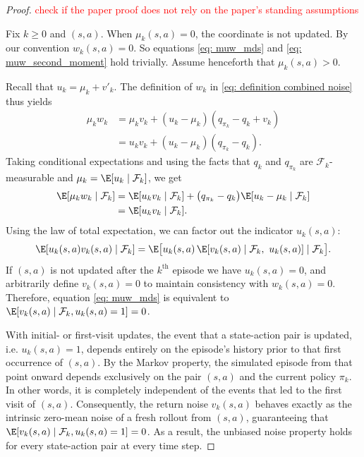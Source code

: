 \begin{proof}
\textcolor{red}{check if the paper proof does not rely on the paper's standing assumptions}

Fix $k\ge 0$ and $(s,a)$. When $\mu_k(s,a)=0$, the coordinate is not updated. By our convention $w_k(s,a)=0$. So equations \eqref{eq: muw_mds} and \eqref{eq: muw_second_moment} hold trivially. Assume henceforth that $\mu_k(s,a)>0$.

Recall that $u_k=\mu_k+v'_k$.
The definition of $w_k$ in \eqref{eq: definition combined noise} thus yields
\begin{align}
\label{eq: algebra_rewrite_muw}
\mu_k w_k
&= \mu_k v_k + (u_k-\mu_k)(q_{\pi_k}-q_k+v_k) \nonumber\\
&= u_k v_k + (u_k-\mu_k)(q_{\pi_k} - q_k).
\end{align}
Taking conditional expectations and using the facts that $q_k$ and $q_{\pi_k}$ are $\mathcal F_k$-measurable and $\mu_k=\E[u_k\mid \mathcal F_k]$, we get
\begin{align}
\label{eq: refactor noise}
\E[\mu_k w_k \mid \mathcal F_k] &= \E[u_k v_k \mid \mathcal F_k] + \big(q_{\pi_k}-q_k\big)\E[u_k-\mu_k\mid \mathcal F_k] 
\nonumber \\
&= \E[u_k v_k\mid \mathcal F_k] .
\end{align}
Using the law of total expectation, we can factor out the indicator $u_k(s,a)$:
\begin{align}
\label{eq: showter expectation}
\E[u_k(s,a)v_k(s,a)\mid \mathcal F_k] 
= \E\big[
u_k(s,a)\,\E[v_k(s,a)\mid \mathcal F_k,\ u_k(s,a)]\mid \mathcal F_k
\big] .
\end{align}
If $(s,a)$ is not updated after the $k^{\text{th}}$ episode we have $u_k(s,a)=0$, and arbitrarily define $v_k(s,a) = 0$ to maintain consistency with $w_k(s,a)=0$.
Therefore, 
equation \eqref{eq: muw_mds} is equivalent to $\E[v_k(s,a)\mid \mathcal F_k, u_k(s,a)=1] = 0$.

With initial- or first-visit updates, the event that a state-action pair is updated, i.e. $u_k(s,a) = 1$, depends entirely on the episode's history prior to that first occurrence of $(s,a)$. By the Markov property, the simulated episode from that point onward depends exclusively on the pair $(s,a)$ and the current policy $\pi_k$. In other words, it is completely independent of the events that led to the first visit of $(s,a)$. Consequently, the return noise $v_k(s,a)$ behaves exactly as the intrinsic zero-mean noise of a fresh rollout from $(s,a)$, guaranteeing that $\E[v_k(s,a) \mid \mathcal{F}_k, u_k(s,a)=1] = 0$.
As a result, 
the unbiased noise property holds for every state-action pair at every time step.



\end{proof}
